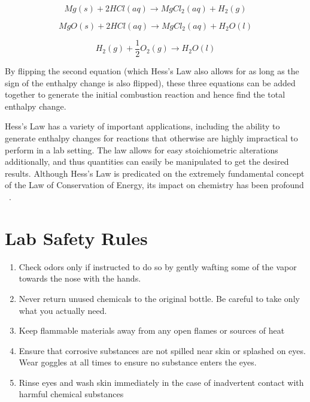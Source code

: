 \documentclass[12pt]{article}
\begin{document}
	\begin{equation}
	\label{eq:mg-plus-hcl}
	Mg(s) + 2HCl(aq) \rightarrow MgCl_2(aq) + H_2(g) 
	\end{equation}

	\begin{equation}
	\label{eq:mgo-plus-hcl}
	MgO(s) + 2HCl(aq) \rightarrow MgCl_2(aq) + H_2O(l) 
	\end{equation}

	\begin{equation}
	\label{eq:water}
	H_2(g) + \frac{1}{2}O_2(g) \rightarrow H_2O(l)
	\end{equation}

	By flipping the second equation (which Hess's Law also allows for as long as the sign of the enthalpy change is also flipped), these three equations can be added together to generate the initial combustion reaction and hence find the total enthalpy change.

	Hess's Law has a variety of important applications, including the ability to generate enthalpy changes for reactions that otherwise are highly impractical to perform in a lab setting. The law allows for easy stoichiometric alterations additionally, and thus quantities can easily be manipulated to get the desired results. Although Hess's Law is predicated on the extremely fundamental concept of the Law of Conservation of Energy, its impact on chemistry has been profound ~\parencite{the_fact_factor_2020}.

\section{Lab Safety Rules}

	\begin{enumerate}
		\item Check odors only if instructed to do so by gently wafting some of the vapor towards the nose with the hands.
		\item Never return unused chemicals to the original bottle. Be careful to take only what you actually need.
		\item Keep flammable materials away from any open flames or sources of heat
		\item Ensure that corrosive substances are not spilled near skin or splashed on eyes. Wear goggles at all times to ensure no substance enters the eyes.
		\item Rinse eyes and wash skin immediately in the case of inadvertent contact with harmful chemical substances
	\end{enumerate}
\end{document}
